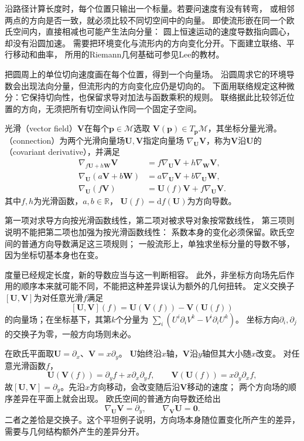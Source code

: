 沿路径计算长度时，每个位置只输出一个标量。若要问速度有没有转弯，
或相邻两点的方向是否一致，就必须比较不同切空间中的向量。
即使流形嵌在同一个欧氏空间内，直接相减也可能产生法向分量：
圆上恒速运动的速度导数指向圆心，却没有沿圆加速。
需要把环境变化与流形内的方向变化分开。下面建立联络、平行移动和曲率，
所用的Riemann几何基础可参见Lee的教材。


把圆周上的单位切向速度画在每个位置，得到一个向量场。
沿圆周求它的环境导数会出现法向分量，但流形内的方向变化应仍是切向的。
下面用联络规定这种微分：它保持切向性，也保留求导对加法与函数乘积的规则。
联络据此比较邻近位置的方向，无须把所有切空间认作同一个固定子空间。

\begin{definition}[向量场与联络]
\label{def:geometry-connection}
光滑（vector field）$\bm V$在每个$\bm p\in\mathcal M$选取
$\bm V(\bm p)\in T_{\bm p}\mathcal M$，其坐标分量光滑。
（connection）为两个光滑向量场$\bm U,\bm V$指定向量场
$\nabla_{\bm U}\bm V$，称为$\bm V$沿$\bm U$的
（covariant derivative），并满足
\[
 \begin{aligned}
 \nabla_{f\bm U+h\bm W}\bm V
   &=f\nabla_{\bm U}\bm V+h\nabla_{\bm W}\bm V,\\
 \nabla_{\bm U}(a\bm V+b\bm W)
   &=a\nabla_{\bm U}\bm V+b\nabla_{\bm U}\bm W,\\
 \nabla_{\bm U}(f\bm V)
   &=\bm U(f)\bm V+f\nabla_{\bm U}\bm V.
 \end{aligned}
\]
其中$f,h$为光滑函数，$a,b\in\mathbb R$，
$\bm U(f)=\mathrm df(\bm U)$为方向导数。
\end{definition}
第一项对求导方向按光滑函数线性，第二项对被求导对象按常数线性，
第三项则说明不能把第二项也加强为按光滑函数线性：
系数本身的变化必须保留。欧氏空间的普通方向导数满足这三项规则；
一般流形上，单独求坐标分量的导数不够，因为坐标切基本身也在变。

度量已经规定长度，新的导数应当与这一判断相容。
此外，非坐标方向场先后作用的顺序本来就可能不同，不能把这种差异误认为额外的几何扭转。
定义交换子$[\bm U,\bm V]$为对任意光滑$f$满足
\[
 [\bm U,\bm V](f)=\bm U(\bm V(f))-\bm V(\bm U(f))
\]
的向量场；在坐标基下，其第$k$个分量为
$\sum_i(U^i\partial_iV^k-V^i\partial_iU^k)$。
坐标方向$\partial_i,\partial_j$的交换子为零，一般方向场则未必。

\begin{example}[平面上不可交换的方向场]
\label{ex:geometry-plane-field-commutator}
在欧氏平面取$\bm U=\partial_x$、$\bm V=x\partial_y$。
$\bm U$始终沿$x$轴，$\bm V$沿$y$轴但其大小随$x$改变。
对任意光滑函数$f$，
\[
 \bm U(\bm V(f))=\partial_yf+x\partial_x\partial_yf,\qquad
 \bm V(\bm U(f))=x\partial_y\partial_xf,
\]
故$[\bm U,\bm V]=\partial_y$。先沿$x$方向移动，会改变随后沿$\bm V$移动的速度；
两个方向场的顺序差异在平面上就会出现。
欧氏空间的普通方向导数还给出
\[
 \nabla_{\bm U}\bm V=\partial_y,\qquad
 \nabla_{\bm V}\bm U=\bm0.
\]
二者之差恰是交换子。这个平坦例子说明，方向场本身随位置变化所产生的差异，
需要与几何结构额外产生的差异分开。
\end{example}

